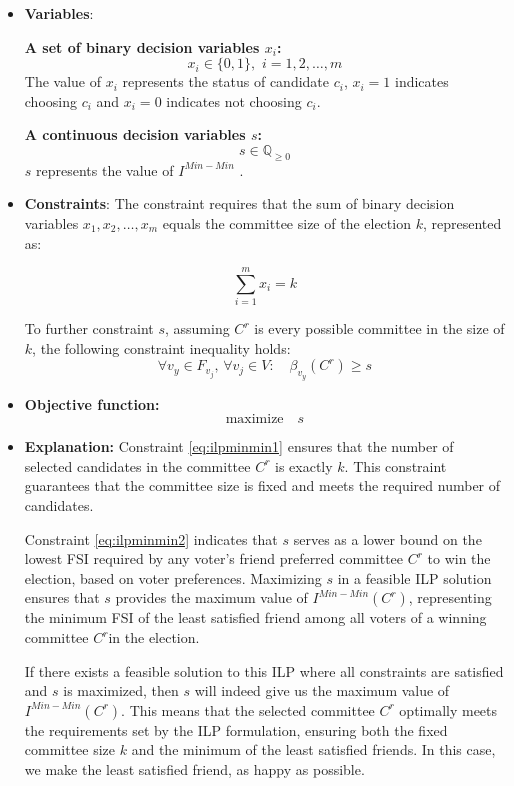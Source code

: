 \documentclass{article}
\begin{document}
\begin{itemize}

  \item \textbf{Variables}: 

\textbf{A set of binary decision variables $x_i$:} \[  x_i \in \{0, 1\} , \,\, i=1,2,\dots, m \] The value of $x_i$ represents the status of candidate $c_i$, \(x_i = 1\) indicates choosing $c_i$ and \(x_i = 0\) indicates not choosing $c_i$.

\textbf{A continuous decision variables $s$:} 
\[  s\in \mathbb{Q}_{\geq 0} \]  
$s$ represents the value of $I^{Min-Min}$ .
    \item \textbf{Constraints}:
The constraint requires that the sum of binary decision variables \(x_1, x_2, \ldots, x_m\) equals the committee size of the election \(k\), represented as:

\begin{equation} \sum_{i=1}^m x_i = k     \label{eq:ilpminmin1}
\end{equation}


To further constraint $s$, assuming $C^r$ is every possible committee in the size of $k$, the following constraint inequality holds:
\begin{equation}   \forall v_y \in F_{v_j}, \,  \forall v_j \in V :\quad \beta_{v_y}(C^{r}) \geq s        \label{eq:ilpminmin2}
\end{equation}

  
  \item  \textbf{Objective function:}
  \[\text{maximize} \quad s \]

 \item  \textbf{Explanation:}
Constraint \ref{eq:ilpminmin1} ensures that the number of selected candidates in the committee \(C^r\) is exactly \(k\). This constraint guarantees that the committee size is fixed and meets the required number of candidates.

Constraint \ref{eq:ilpminmin2} indicates that \(s\) serves as a lower bound on the lowest FSI required by any voter's friend preferred committee \(C^r\) to win the election, based on voter preferences. Maximizing \(s\) in a feasible ILP solution ensures that \(s\) provides the maximum value of \(I^{Min-Min}(C^{r})\), representing the minimum FSI of the least satisfied friend among all voters of a winning committee \(C^r\)in the election. 

If there exists a feasible solution to this ILP where all constraints are satisfied and \(s\) is maximized, then \(s\) will indeed give us the maximum value of \(I^{Min-Min}(C^{r})\). This means that the selected committee \(C^r\) optimally meets the requirements set by the ILP formulation, ensuring both the fixed committee size \(k\) and the minimum of the least satisfied friends. In this case, we make the least satisfied friend, as happy as possible.
\end{itemize}
\end{document}
